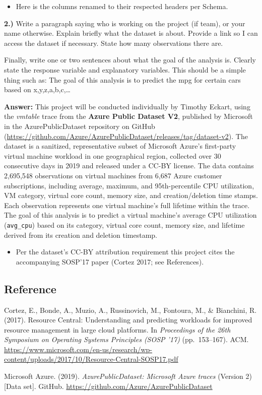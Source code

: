 \documentclass[
]{article}
\providecommand{\tightlist}{%
  \setlength{\itemsep}{0pt}\setlength{\parskip}{0pt}}
\begin{document}
\begin{itemize}
\tightlist
\item
  Here is the columns renamed to their respected headers per Schema.
\end{itemize}

\textbf{2.)} Write a paragraph saying who is working on the project (if
team), or your name otherwise. Explain briefly what the dataset is
about. Provide a link so I can access the dataset if necessary. State
how many observations there are.\n

Finally, write one or two sentences about what the goal of the analysis
is. Clearly state the response variable and explanatory variables. This
should be a simple thing such as: The goal of this analysis is to
predict the mpg for certain cars based on x,y,z,a,b,c,\ldots{}\n

\textbf{Answer:} This project will be conducted individually by Timothy
Eckart, using the \emph{vmtable} trace from the \textbf{Azure Public
Dataset V2}, published by Microsoft in the AzurePublicDataset repository
on GitHub
(\url{https://github.com/Azure/AzurePublicDataset/releases/tag/dataset-v2}).
The dataset is a sanitized, representative subset of Microsoft Azure's
first-party virtual machine workload in one geographical region,
collected over 30 consecutive days in 2019 and released under a CC-BY
license. The data contains 2,695,548 observations on virtual machines
from 6,687 Azure customer subscriptions, including average, maximum, and
95th-percentile CPU utilization, VM category, virtual core count, memory
size, and creation/deletion time stamps. Each observation represents one
virtual machine's full lifetime within the trace. The goal of this
analysis is to predict a virtual machine's average CPU utilization
(\texttt{avg\_cpu}) based on its category, virtual core count, memory
size, and lifetime derived from its creation and deletion timestamp. \n

\begin{itemize}
\tightlist
\item
  Per the dataset's CC-BY attribution requirement this project cites the
  accompanying SOSP'17 paper (Cortez 2017; see References).
\end{itemize}

\subsection{Reference}\label{reference}

Cortez, E., Bonde, A., Muzio, A., Russinovich, M., Fontoura, M., \&
Bianchini, R. (2017). Resource Central: Understanding and predicting
workloads for improved resource management in large cloud platforms. In
\emph{Proceedings of the 26th Symposium on Operating Systems Principles
(SOSP '17)} (pp.~153--167). ACM.
\url{https://www.microsoft.com/en-us/research/wp-content/uploads/2017/10/Resource-Central-SOSP17.pdf}
\n

Microsoft Azure. (2019). \emph{AzurePublicDataset: Microsoft Azure
traces} (Version 2) {[}Data set{]}. GitHub.
\url{https://github.com/Azure/AzurePublicDataset}

\n
\n
\end{document}
